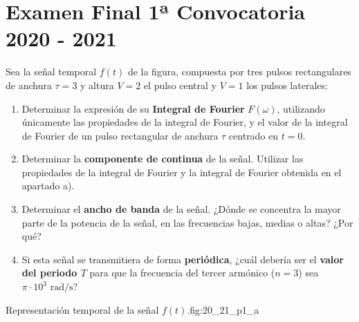 \newpage
\section{Examen Final 1ª Convocatoria 2020 - 2021}

\begin{problema}
Sea la señal temporal $f(t)$ de la figura, compuesta por tres pulsos rectangulares de anchura $\tau = 3$ y altura $V = 2$ el pulso central y $V = 1$ los pulsos laterales:

\begin{enumerate}[label=\alph*)]
    \item Determinar la expresión de su \textbf{Integral de Fourier} $F(\omega)$, utilizando únicamente las propiedades de la integral de Fourier, y el valor de la integral de Fourier de un pulso rectangular de anchura $\tau$ centrado en $t=0$.
    \item Determinar la \textbf{componente de continua} de la señal. Utilizar las propiedades de la integral de Fourier y la integral de Fourier obtenida en el apartado a).
    \item Determinar el \textbf{ancho de banda} de la señal. ¿Dónde se concentra la mayor parte de la potencia de la señal, en las frecuencias bajas, medias o altas? ¿Por qué?
    \item Si esta señal se transmitiera de forma \textbf{periódica}, ¿cuál debería ser el \textbf{valor del periodo $T$} para que la frecuencia del tercer armónico ($n=3$) sea $\pi \cdot 10^3\text{ rad/s}$?
\end{enumerate}
\end{problema}

%
       {Representación temporal de la señal $f(t)$.}{fig:20_21_p1_a}

